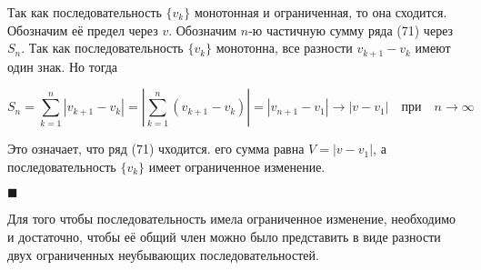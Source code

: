 Так как последовательность $\{v_k\}$ монотонная и ограниченная, то она сходится. Обозначим её предел через $v$. Обозначим $n$-ю частичную сумму ряда (71) через $S_n$. Так как последовательность $\{v_k\}$ монотонна, все разности $v_{k + 1} - v_k$ имеют один знак. Но тогда

\begin{equation*}
	S_n = \displaystyle\sum_{k = 1}^n |v_{k + 1} - v_k| = \left| \displaystyle\sum_{k = 1}^n (v_{k + 1} - v_k) \right| = |v_{n + 1} - v_1| \rightarrow |v - v_1| \quad \mbox{при} \quad n \rightarrow \infty
\end{equation*}

Это означает, что ряд (71) чходится. его сумма равна $V = |v - v_1|$, а последовательность $\{v_k\}$ имеет ограниченное изменение.

\begin{flushright}
	$\blacksquare$
\end{flushright}

\begin{statm}
	Для того чтобы последовательность имела ограниченное изменение, необходимо и достаточно, чтобы её общий член можно было представить в виде разности двух ограниченных неубывающих последовательностей.
\end{statm}